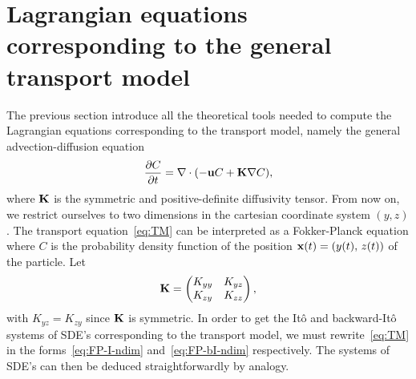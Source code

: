 \section{Lagrangian equations corresponding to the general transport model}
The previous section introduce all the theoretical tools needed to compute the Lagrangian equations corresponding to the transport model, namely the general advection-diffusion equation
\begin{equation} \label{eq:TM}
	\frac{\partial C}{\partial t} = \nabla \cdot (-\mathbf u C + \mathbf K \nabla C),
\end{equation}
where $\mathbf K$ is the symmetric and positive-definite diffusivity tensor.
From now on, we restrict ourselves to two dimensions in the cartesian coordinate system $(y,z)$. 
The transport equation~\eqref{eq:TM} can be interpreted as a Fokker-Planck equation where $C$ is the probability density function of the position $\mathbf x(t) = (y(t),\,z(t))$ of the particle. Let
\begin{equation}
	\mathbf K = \begin{pmatrix} K_{yy} & K_{yz}\\ K_{zy} & K_{zz} \end{pmatrix},
\end{equation}
with $K_{yz} = K_{zy}$ since $\mathbf K$ is symmetric. In order to get the Itô and backward-Itô systems of SDE's corresponding to the transport model, we must rewrite~\eqref{eq:TM} in the forms~\eqref{eq:FP-I-ndim} and~\eqref{eq:FP-bI-ndim} respectively. The systems of SDE's can then be deduced straightforwardly by analogy.

